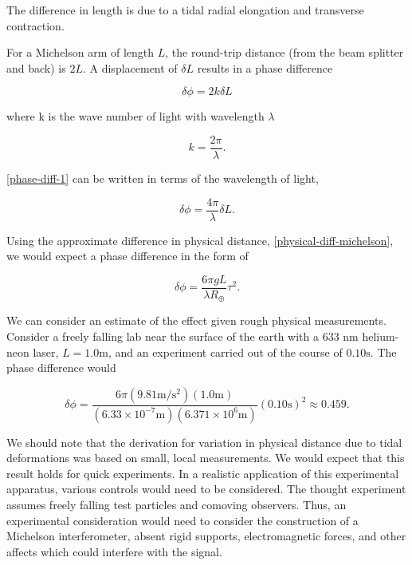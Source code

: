\documentclass[11pt]{article}
\begin{document}
The difference in length is due to a tidal radial elongation and transverse contraction. 

For a Michelson arm of length $L$, the round-trip distance (from the beam splitter and back) is $2L$. A displacement of $\delta L$ results in a phase difference

\begin{equation}
    \label{phase-diff-1}
    \delta \phi = 2 k \delta L
\end{equation}

where k is the wave number of light with wavelength $\lambda$

\begin{equation}
    \label{wave-number}
    k = \frac{2 \pi}{\lambda}.
\end{equation}

\eqref{phase-diff-1} can be written in terms of the wavelength of light,

\begin{equation}
    \label{phase-diff-2}
    \delta \phi = \frac{4 \pi}{\lambda} \delta L.
\end{equation}

Using the approximate difference in physical distance, \eqref{physical-diff-michelson}, we would expect a phase difference in the form of

\begin{equation}
    \label{phase-diff-3}
    \delta \phi = \frac{6 \pi gL}{\lambda R_{\oplus}}\tau^2.
\end{equation}

We can consider an estimate of the effect given rough physical measurements. Consider a freely falling lab near the surface of the earth with a 633 nm helium-neon laser, $L = 1.0 \mathrm{m}$, and an experiment carried out of the course of $0.10 \mathrm{s}$. The phase difference would
    
\begin{equation}
    \label{phase-diff-est}
    \delta \phi = \frac{6 \pi (9.81 \mathrm{m}/\mathrm{s}^2)(1.0 \mathrm{m})}{\left(6.33 \times 10^{-7} \mathrm{m}\right) \left(6.371 \times 10^6 \mathrm{m}\right)}(0.10 \mathrm{s})^2 \approx 0.459.
\end{equation}

We should note that the derivation for variation in physical distance due to tidal deformations was based on small, local measurements. We would expect that this result holds for quick experiments. In a realistic application of this experimental apparatus, various controls would need to be considered. The thought experiment assumes freely falling test particles and comoving observers. Thus, an experimental consideration would need to consider the construction of a Michelson interferometer, absent rigid supports, electromagnetic forces, and other affects which could interfere with the signal.
\end{document}
